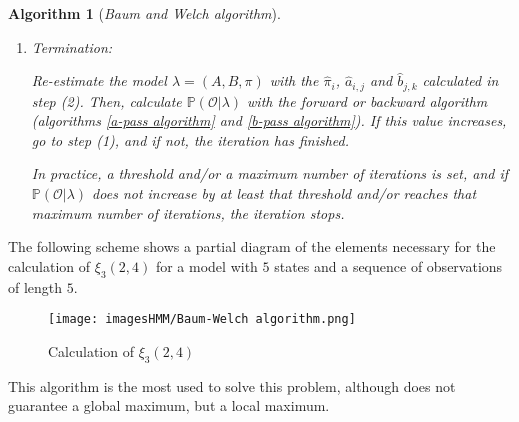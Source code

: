 \documentclass[12pt]{article}
\newtheorem{algorithm2}{Algorithm}
\def\OO{\mathcal{O}}
\def\PP{\mathbb{P}}
\numberwithin{equation}{section}
\begin{document}
\begin{algorithm2}[\emph{Baum and Welch algorithm}]
\begin{enumerate}
    For $i,j \in \{0,1, \dots N-1\}$ and $j = 0,1,\dots,M-1$, compute 
    \begin{equation}\label{pi BW}
    \hat{\pi}_{i} = {\text{Expected frequency in} \atop \text{state $q_{i}$ at time $t=0$}} = \gamma_{0}(i),
    \end{equation}
    \begin{equation}\label{a BW}
    \hat{a}_{i,j} = \frac{{\text{Expected number of} \atop \text{transitions from $q_{i}$ to $q_{j}$}}}{{\text{Expected number of} \atop \text{transitions from $q_{i}$}}} = \frac{\displaystyle\sum_{t=0}^{T-2} \xi_{t}(i,j)}{\displaystyle\sum_{t=0}^{T-2} \gamma_{t}(i)}
    \end{equation}
    and
    \begin{equation}\label{b BW}
    \hat{b}_{j,k} = \frac{{\text{Expected number of} \atop \text{emissions of $k$ from $q_{j}$}}}{{\text{Expected number} \atop \text{of visits to $q_{j}$}}} = \frac{\displaystyle\sum_{{\{t: 0 \leq t \leq T-1, \atop \OO_{t} = k\}}} \gamma_{t}(j)}{\displaystyle\sum_{t=0}^{T-1} \gamma_{t}(j)}.
    \end{equation}

    \item Termination:

    Re-estimate the model $\lambda = (A,B,\pi)$ with the $\hat{\pi}_{i}$, $\hat{a}_{i,j}$ and $\hat{b}_{j,k}$ calculated in step (2). Then, calculate $\PP(\OO| \lambda)$ with the forward or backward algorithm (algorithms \ref{a-pass algorithm} and \ref{b-pass algorithm}). If this value increases, go to step (1), and if not, the iteration has finished.

    In practice, a threshold and/or a maximum number of iterations is set, and if $\PP(\OO| \lambda)$ does not increase by at least that threshold and/or reaches that maximum number of iterations, the iteration stops.
\end{enumerate}
\end{algorithm2}

The following scheme shows a partial diagram of the elements necessary for the calculation of $\xi_{3}(2,4)$ for a model with $5$ states and a sequence of observations of length $5$.
\begin{figure}[H]
\centering
\texttt{[image: imagesHMM/Baum-Welch algorithm.png]}
\caption{Calculation of $\xi_{3}(2,4)$}
\label{fig:example BW}
\end{figure}

This algorithm is the most used to solve this problem, although does not guarantee a global maximum, but a local maximum.
\end{document}
